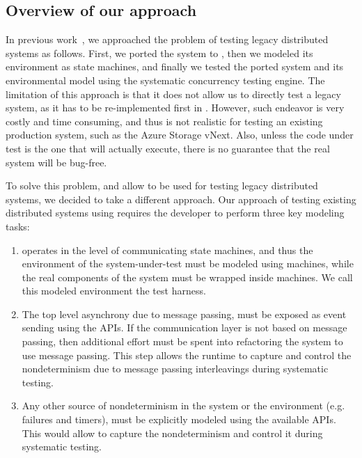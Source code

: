 
\subsection{Overview of our approach}
\label{sec:method:model}

In previous work~\cite{deligiannis2015psharp}, we approached the problem of testing legacy distributed systems as follows. First, we ported the system to \psharp, then we modeled its environment as \psharp state machines, and finally we tested the ported system and its environmental model using the \psharp systematic concurrency testing engine. The limitation of this approach is that it does not allow us to directly test a legacy system, as it has to be re-implemented first in \psharp. However, such endeavor is very costly and time consuming, and thus is not realistic for testing an existing production system, such as the Azure Storage vNext. Also, unless the code under test is the one that will actually execute, there is no guarantee that the real system will be bug-free.

To solve this problem, and allow \psharp to be used for testing legacy distributed systems, we decided to take a different approach. Our approach of testing existing distributed systems using \psharp requires the developer to perform three key modeling tasks:

\begin{enumerate}
\item \psharp operates in the level of communicating state machines, and thus the environment of the system-under-test must be modeled using \psharp machines, while the real components of the system must be wrapped inside \psharp machines. We call this modeled environment the \psharp test harness.

\item The top level asynchrony due to message passing, must be exposed as event sending using the \psharp APIs. If the communication layer is not based on message passing, then additional effort must be spent into refactoring the system to use message passing. This step allows the \psharp runtime to capture and control the nondeterminism due to message passing interleavings during systematic testing.

\item Any other source of nondeterminism in the system or the environment (e.g. failures and timers), must be explicitly modeled using the available \psharp APIs. This would allow \psharp to capture the nondeterminism and control it during systematic testing.
\end{enumerate}

